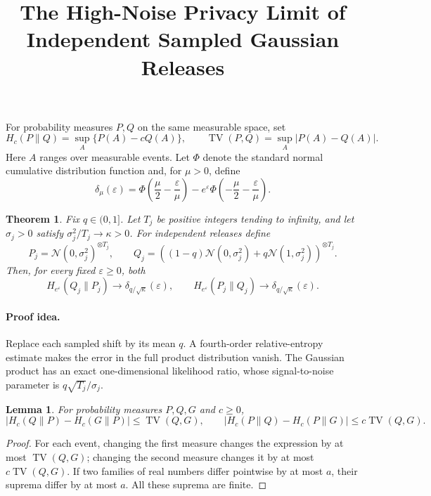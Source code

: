 \documentclass[a4paper,11pt]{article}
\title{The High-Noise Privacy Limit of Independent Sampled Gaussian Releases}
\author{}
\date{}
\newtheorem{theorem}{Theorem}
\newtheorem{lemma}{Lemma}
\newcommand{\TV}{\operatorname{TV}}
\newcommand{\Normal}{\mathcal N}
\begin{document}
\maketitle

For probability measures $P,Q$ on the same measurable space, set
\[
 H_c(P\|Q)=\sup_A\{P(A)-cQ(A)\},\qquad
 \TV(P,Q)=\sup_A|P(A)-Q(A)|.
\]
Here $A$ ranges over measurable events. Let $\Phi$ denote the standard normal cumulative distribution function and, for $\mu>0$, define
\[
 \delta_\mu(\varepsilon)=\Phi\left(\frac\mu2-\frac\varepsilon\mu\right)
 -e^\varepsilon\Phi\left(-\frac\mu2-\frac\varepsilon\mu\right).
\]

\begin{theorem}\label{thm:limit}
Fix $q\in(0,1]$. Let $T_j$ be positive integers tending to infinity, and let $\sigma_j>0$ satisfy $\sigma_j^2/T_j\to\kappa>0$. For independent releases define
\[
 P_j=\Normal(0,\sigma_j^2)^{\otimes T_j},\qquad
 Q_j=((1-q)\Normal(0,\sigma_j^2)+q\Normal(1,\sigma_j^2))^{\otimes T_j}.
\]
Then, for every fixed $\varepsilon\geq0$, both
\[
 H_{e^\varepsilon}(Q_j\|P_j)\longrightarrow\delta_{q/\sqrt\kappa}(\varepsilon),
 \qquad
 H_{e^\varepsilon}(P_j\|Q_j)\longrightarrow\delta_{q/\sqrt\kappa}(\varepsilon).
\]
\end{theorem}

\paragraph{Proof idea.}
Replace each sampled shift by its mean $q$. A fourth-order relative-entropy estimate makes the error in the full product distribution vanish. The Gaussian product has an exact one-dimensional likelihood ratio, whose signal-to-noise parameter is $q\sqrt{T_j}/\sigma_j$.

\begin{lemma}\label{lem:tv}
For probability measures $P,Q,G$ and $c\geq0$,
\[
 |H_c(Q\|P)-H_c(G\|P)|\leq\TV(Q,G),\qquad
 |H_c(P\|Q)-H_c(P\|G)|\leq c\TV(Q,G).
\]
\end{lemma}
\begin{proof}
For each event, changing the first measure changes the expression by at most $\TV(Q,G)$; changing the second measure changes it by at most $c\TV(Q,G)$. If two families of real numbers differ pointwise by at most $a$, their suprema differ by at most $a$. All these suprema are finite.
\end{proof}
\end{document}
